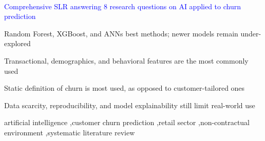 \documentclass[preprint,12pt]{elsarticle}
\begin{document}
\begin{frontmatter}
\

\begin{highlights}
\item \textcolor{blue}{Comprehensive SLR answering 8 research questions on AI applied to churn prediction}
\item Random Forest, XGBoost, and ANNs best methods; newer models remain under-explored
\item Transactional, demographics, and behavioral features are the most commonly used
\item Static definition of churn is most used, as opposed to customer-tailored ones
\item Data scarcity, reproducibility, and model explainability still limit real-world use 
\end{highlights}

\begin{keyword}
artificial intelligence \sep customer churn prediction \sep retail sector \sep non-contractual environment \sep systematic literature review  
\end{keyword}

\end{frontmatter}








%
 



\newpage

\end{document}

